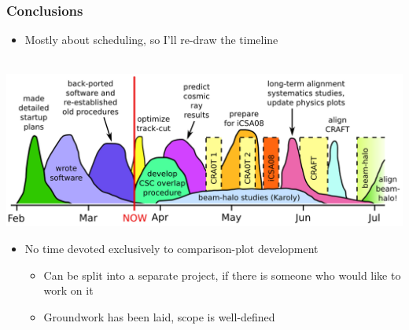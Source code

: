 \documentclass[compress]{beamer}
\begin{document}
\begin{frame}
\frametitle{Conclusions}
\begin{itemize}
\item Mostly about scheduling, so I'll re-draw the timeline
\end{itemize}

\vfill
\mbox{\hspace{-0.75 cm} \includegraphics[width=1.12\linewidth]{plan.png}}

\vfill
\begin{itemize}
\item No time devoted exclusively to comparison-plot development
\begin{itemize}
\item Can be split into a separate project, if there is someone who would like to work on it
\item Groundwork has been laid, scope is well-defined
\end{itemize}
\end{itemize}

\label{numpages}
\end{frame}
\end{document}
